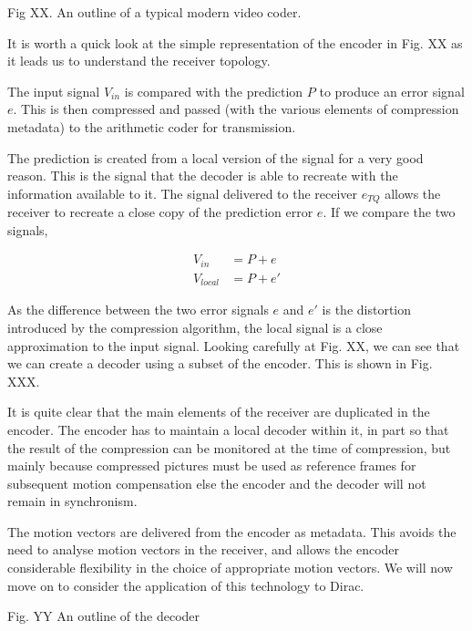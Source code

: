 Fig XX. An outline of a typical modern video coder.

It is worth a quick look at the simple representation of the encoder in
Fig. XX as it leads us to understand the receiver topology.

The input signal $V_{in}$ is compared with the prediction $P$ to produce
an error signal $e$.  This is then compressed and passed (with the
various elements of compression metadata) to the arithmetic coder for
transmission.

The prediction is created from a local version of the signal for a very
good reason.  This is the signal that the decoder is able to recreate
with the information available to it. The signal delivered to the
receiver  $e_{TQ}$ allows the receiver to recreate a close copy of the
prediction error $e$. If we compare the two signals,

\begin{align*}
  V_{in} &= P + e \\
  V_{local}	&= P + e'
\end{align*}

As the difference between the two error signals $e$ and $e'$ is the
distortion introduced by the compression algorithm, the local signal is
a close approximation to the input signal. Looking carefully at Fig. XX,
we can see that we can create a decoder using a subset of the encoder.
This is shown in Fig. XXX.

It is quite clear that the main elements of the receiver are duplicated
in the encoder.  The encoder has to maintain a local decoder within it,
in part so that the result of the compression can be monitored at the
time of compression, but mainly because compressed pictures must be used
as reference frames for subsequent motion compensation else the encoder
and the decoder will not remain in synchronism.

The motion vectors are delivered from the encoder as metadata. This
avoids the need to analyse motion vectors in the receiver, and allows
the encoder considerable flexibility in the choice of appropriate motion
vectors.  We will now move on to consider the application of this
technology to Dirac.


Fig. YY An outline of the decoder

